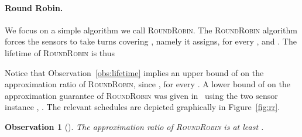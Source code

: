 \documentclass[11pt]{article}
\newtheorem{observation}[lemma]{Observation}
\newcommand{\rr}{\textsc{RoundRobin}\xspace}
\begin{document}
\paragraph*{\bf Round Robin.} 
We focus on a simple algorithm we call \rr.  The \rr algorithm forces
the sensors to take turns covering , namely it assigns, for every
,  and .  
The lifetime of \rr is thus

Notice that Observation~\ref{obs:lifetime} implies an upper bound of
 on the approximation ratio of \rr, since , for every
.
A lower bound of  on the approximation guarantee of \rr
was given in~\cite{barnoy2011maximizing} using the two sensor instance
, .  The relevant schedules
are depicted graphically in Figure~\ref{fig:rr}.

\begin{observation}[\cite{barnoy2011maximizing}]
\label{obs:rr}
The approximation ratio of \rr is at least .
\end{observation}
\end{document}
